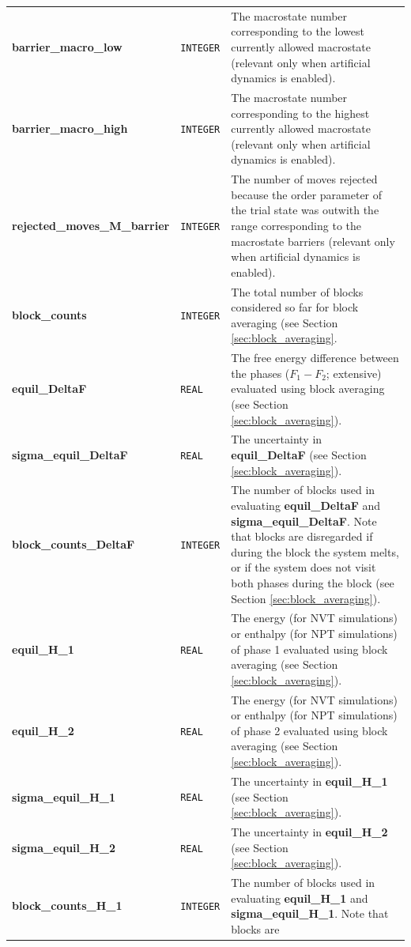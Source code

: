 \documentclass{report}
\begin{document}
\begin{landscape}
\begin{center}
\begin{longtable}{ l l p{8cm}}
\textbf{barrier\_macro\_low} & \texttt{INTEGER} & The macrostate number corresponding to the lowest currently allowed macrostate (relevant only when artificial
dynamics is enabled). \\
\textbf{barrier\_macro\_high} & \texttt{INTEGER} & The macrostate number corresponding to the highest currently allowed macrostate (relevant only when artificial
dynamics is enabled). \\
\textbf{rejected\_moves\_M\_barrier} & \texttt{INTEGER} & The number of moves rejected because the order parameter of the trial state was outwith the range
corresponding to the macrostate barriers (relevant only when artificial dynamics is enabled).\\
\textbf{block\_counts} & \texttt{INTEGER} & The total number of blocks considered so far for block averaging (see Section \ref{sec:block_averaging}.  \\
\textbf{equil\_DeltaF} & \texttt{REAL} & The free energy difference between the phases ($F_1-F_2$; extensive) evaluated using block averaging (see Section \ref{sec:block_averaging}).\\
\textbf{sigma\_equil\_DeltaF} & \texttt{REAL} & The uncertainty in \textbf{equil\_DeltaF} (see Section \ref{sec:block_averaging}).\\
\textbf{block\_counts\_DeltaF} & \texttt{INTEGER} & The number of blocks used in evaluating \textbf{equil\_DeltaF} and \textbf{sigma\_equil\_DeltaF}. Note that
blocks are disregarded if during the block the system melts, or if the system does not visit both phases during the block  (see Section \ref{sec:block_averaging}). \\
\textbf{equil\_H\_1} & \texttt{REAL} & The energy (for NVT simulations) or enthalpy (for NPT simulations) of phase 1 evaluated using block averaging (see Section \ref{sec:block_averaging}).\\
\textbf{equil\_H\_2} & \texttt{REAL} & The energy (for NVT simulations) or enthalpy (for NPT simulations) of phase 2 evaluated using block averaging (see Section \ref{sec:block_averaging}).\\
\textbf{sigma\_equil\_H\_1} & \texttt{REAL} & The uncertainty in \textbf{equil\_H\_1} (see Section \ref{sec:block_averaging}).\\
\textbf{sigma\_equil\_H\_2} & \texttt{REAL} & The uncertainty in \textbf{equil\_H\_2} (see Section \ref{sec:block_averaging}).\\
\textbf{block\_counts\_H\_1} & \texttt{INTEGER} & The number of blocks used in evaluating \textbf{equil\_H\_1} and \textbf{sigma\_equil\_H\_1}. Note that blocks are

\end{longtable}
\end{center}
\end{landscape}
\end{document}
